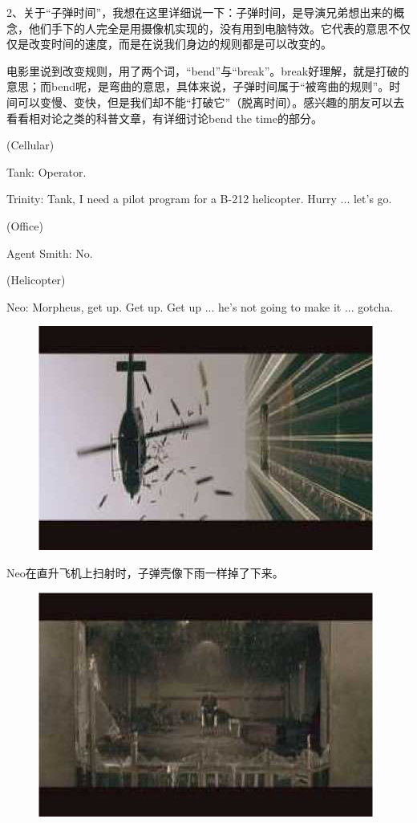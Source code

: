 \documentclass{ctexart}
\newenvironment{myquote}{\color{green} \setlength{\leftskip}{6em} \setlength{\rightskip}{4em} \setlength{\parindent}{-2em}}{\par}
\begin{document}
2、关于“子弹时间”，我想在这里详细说一下：子弹时间，是导演兄弟想出来的概念，他们手下的人完全是用摄像机实现的，没有用到电脑特效。它代表的意思不仅仅是改变时间的速度，而是在说我们身边的规则都是可以改变的。

电影里说到改变规则，用了两个词，“bend”与“break”。break好理解，就是打破的意思；而bend呢，是弯曲的意思，具体来说，子弹时间属于“被弯曲的规则”。时间可以变慢、变快，但是我们却不能“打破它”（脱离时间）。感兴趣的朋友可以去看看相对论之类的科普文章，有详细讨论bend the time的部分。

\begin{myquote}
(Cellular)

Tank: Operator.

Trinity: Tank, I need a pilot program for a B-212 helicopter. Hurry ... let's go.

(Office)

Agent Smith: No.

(Helicopter)

Neo: Morpheus, get up. Get up. Get up ... he's not going to make it ... gotcha.
\end{myquote}

\begin{figure}[htb]
\centering
\includegraphics[width=0.5\linewidth]{fig/read_Matrix-67}
\end{figure}

Neo在直升飞机上扫射时，子弹壳像下雨一样掉了下来。

\begin{figure}[htb]
\centering
\includegraphics[width=0.5\linewidth]{fig/read_Matrix-68}
\end{figure}
\end{document}
